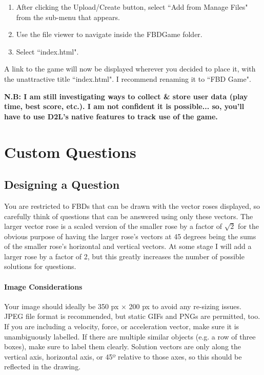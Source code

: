 \documentclass[12pt]{article}
\begin{document}
\begin{enumerate}[leftmargin=16pt,noitemsep]
\item After clicking the Upload/Create button, select ``Add from Manage Files" from the sub-menu that appears.
\item Use the file viewer to navigate inside the FBDGame folder.
\item Select ``index.html".
\end{enumerate}

A link to the game will now be displayed wherever you decided to place it, with the unattractive title ``index.html". I recommend renaming it to ``FBD Game".\par

\textbf{N.B: I am still investigating ways to collect \& store user data (play time, best score, etc.). I am not confident it is possible... so, you'll have to use D2L's native features to track use of the game.}

\section{Custom Questions}
\subsection{Designing a Question}
You are restricted to FBDs that can be drawn with the vector roses displayed, so carefully think of questions that can be answered using only these vectors. The larger vector rose is a scaled version of the smaller rose by a factor of $\sqrt{2}$ for the obvious purpose of having the larger rose's vectors at 45 degrees being the sums of the smaller rose's horizontal and vertical vectors. At some stage I will add a larger rose by a factor of 2, but this greatly increases the number of possible solutions for questions.


\paragraph{Image Considerations}
Your image should ideally be 350 px × 200 px to avoid any re-sizing issues. JPEG file format is recommended, but static GIFs and PNGs are permitted, too. If you are including a velocity, force, or acceleration vector, make sure it is unambiguously labelled. If there are multiple similar objects (e.g. a row of three boxes), make sure to label them clearly. Solution vectors are only along the vertical axis, horizontal axis, or 45º relative to those axes, so this should be reflected in the drawing.
\end{document}
